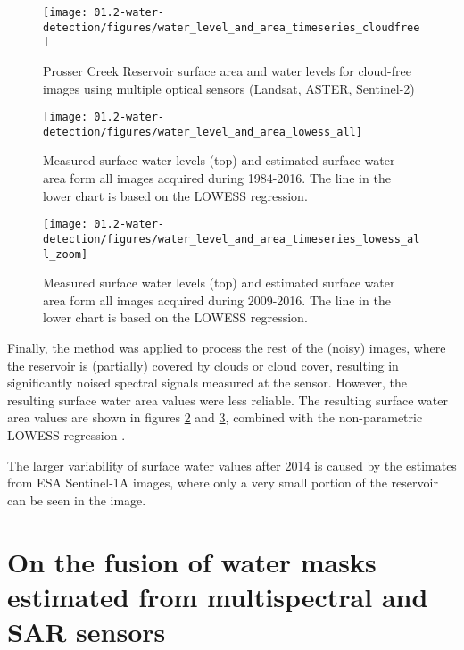 \begin{figure}[H]
	\centering
	\texttt{[image: 01.2-water-detection/figures/water\_level\_and\_area\_timeseries\_cloudfree]}
	\caption{Prosser Creek Reservoir surface area and water levels for cloud-free images using multiple optical sensors (Landsat, ASTER, Sentinel-2)}
	\label{fig:water_level_and_area_timeseries_cloudfree}
\end{figure}

\begin{figure}[H]
	\centering
	\texttt{[image: 01.2-water-detection/figures/water\_level\_and\_area\_lowess\_all]}
	\caption{Measured surface water levels (top) and estimated surface water area form all images acquired during 1984-2016. The line in the lower chart is based on the \gls{LOWESS} regression.}
	\label{fig:water_level_and_area_timeseries_lowess_all}
\end{figure}

\begin{figure}[H]
	\centering
	\texttt{[image: 01.2-water-detection/figures/water\_level\_and\_area\_timeseries\_lowess\_all\_zoom]}
	\caption{Measured surface water levels (top) and estimated surface water area form all images acquired during 2009-2016. The line in the lower chart is based on the \gls{LOWESS} regression.}
	\label{fig:water_level_and_area_timeseries_lowess_all_zoom}
\end{figure}

Finally, the method was applied to process the rest of the (noisy) images, where the reservoir is (partially) covered by clouds or cloud cover, resulting in significantly noised spectral signals measured at the sensor. However, the resulting surface water area values were less reliable. The resulting surface water area values are shown in figures \ref{fig:water_level_and_area_timeseries_lowess_all} and \ref{fig:water_level_and_area_timeseries_lowess_all_zoom}, combined with the non-parametric \gls{LOWESS} regression \citet{cleveland1979robust}. 

The larger variability of surface water values after 2014 is caused by the estimates from ESA Sentinel-1A images, where only a very small portion of the reservoir can be seen in the image.

\section{On the fusion of water masks estimated from multispectral and SAR sensors}


